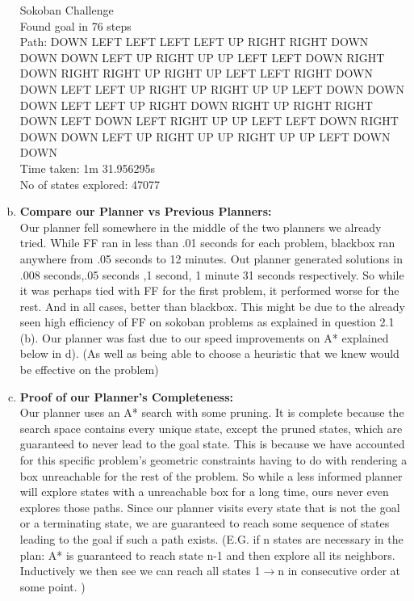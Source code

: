 \documentclass[]{article}
\begin{document}
\begin{enumerate}[(a)]
		Sokoban Challenge\\
		Found goal in 76 steps\\
		Path: DOWN LEFT LEFT LEFT LEFT UP RIGHT RIGHT DOWN DOWN DOWN LEFT UP RIGHT UP UP LEFT LEFT DOWN RIGHT DOWN RIGHT RIGHT UP RIGHT UP LEFT LEFT RIGHT DOWN DOWN LEFT LEFT UP RIGHT UP RIGHT UP UP LEFT DOWN DOWN DOWN LEFT LEFT UP RIGHT DOWN RIGHT UP RIGHT RIGHT DOWN LEFT DOWN LEFT RIGHT UP UP LEFT LEFT DOWN RIGHT DOWN DOWN LEFT UP RIGHT UP UP RIGHT UP UP LEFT DOWN DOWN\\
		Time taken: 1m 31.956295s\\
		No of states explored: 47077\\
		
		\item \textbf{Compare our Planner vs Previous Planners:}\\
		Our planner fell somewhere in the middle of the two planners we already tried. While FF ran in less than .01 seconds for each problem, blackbox ran anywhere from .05 seconds to 12 minutes. Out planner generated solutions in .008 seconds,.05 seconds ,1 second, 1 minute 31 seconds respectively. So while it was perhaps tied with FF for the first problem, it performed worse for the rest. And in all cases, better than blackbox. This might be due to the already seen high efficiency of FF on sokoban problems as explained in question 2.1 (b). Our planner was fast due to our speed improvements on A* explained below in d). (As well as being able to choose a heuristic that we knew would be effective on the problem)\\
		
		\item \textbf{Proof of our Planner's Completeness:}\\
		Our planner uses an A* search with some pruning. It is complete because the search space contains every unique state, except the pruned states, which are guaranteed to never lead to the goal state. This is because we have accounted for this specific problem's geometric constraints having to do with rendering a box unreachable for the rest of the problem. So while a less informed planner will explore states with a unreachable box for a long time, ours never even explores those paths. Since our planner visits every state that is not the goal or a terminating state, we are guaranteed to reach some sequence of states leading to the goal if such a path exists. (E.G. if n states are necessary in the plan: A* is guaranteed to reach state n-1 and then explore all its neighbors. Inductively we then see we can reach all states 1\(\rightarrow\)n in consecutive order at some point. )\\
		

\end{enumerate}
\end{document}

